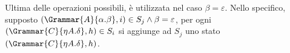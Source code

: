 \documentclass{subfiles}
\begin{document}
Ultima delle operazioni possibili, è utilizzata nel caso \(\beta = \varepsilon\).
Nello specifico, supposto \((\Grammar{A}{\alpha . \beta}, i) \in S_{j} \land \beta = \varepsilon\), per ogni \((\Grammar{C}{\eta A. \delta}, h) \in S_{i}\)
si aggiunge ad \(S_{j}\) uno stato \((\Grammar{C}{\eta A. \delta}, h)\).
\end{document}
